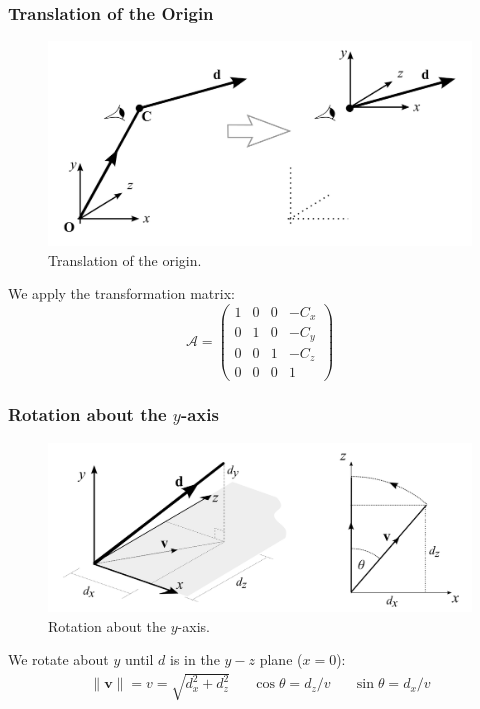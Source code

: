 \documentclass[11pt]{article}
\begin{document}
\subsubsection{Translation of the Origin}

\begin{figure}[htb!]
  \caption{Translation of the origin.}
  \includegraphics[scale=0.2]{transorigin}
  \centering
\end{figure}

We apply the transformation matrix:
\[
  \mathcal{A} =
  \begin{pmatrix}
    1 & 0 & 0 & -C_x \\
    0 & 1 & 0 & -C_y \\
    0 & 0 & 1 & -C_z \\
    0 & 0 & 0 & 1
  \end{pmatrix}
\]

\subsubsection{Rotation about the $y$-axis}
\begin{figure}[htb!]
  \caption{Rotation about the $y$-axis.}
  \includegraphics[scale=0.2]{roty}
  \centering
\end{figure}

We rotate about $y$ until $d$ is in the $y-z$ plane ($x = 0$):
\begin{align*}
  \lVert \textbf{v} \lVert = v = \sqrt{d_x^2 + d_z^2} && \cos \theta = d_z / v && \sin \theta = d_x / v
\end{align*}
\end{document}

